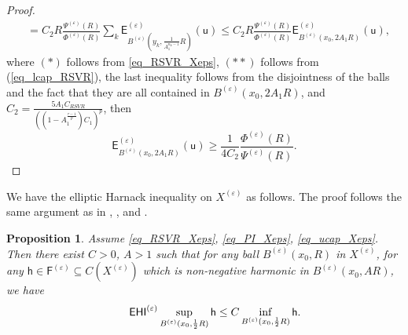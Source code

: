 \documentclass[11pt,a4paper]{article}
\numberwithin{equation}{section}
\theoremstyle{plain}
\newtheorem{proposition}[theorem]{Proposition}
\theoremstyle{definition}
\begin{document}
\begin{proof}
\begin{align*}
&=C_2R\frac{\Psi^{(\varepsilon)}(R)}{\Phi^{(\varepsilon)}(R)}\sum_k\mathsf{E}^{(\varepsilon)}_{B^{(\varepsilon)}(y_k,\frac{1}{A_1^{n_k-1}}R)}(\mathsf{u})\le C_2R\frac{\Psi^{(\varepsilon)}(R)}{\Phi^{(\varepsilon)}(R)}\mathsf{E}^{(\varepsilon)}_{B^{(\varepsilon)}(x_0,2A_1R)}(\mathsf{u}),
\end{align*}
where $(*)$ follows from \ref{eq_RSVR_Xeps}, $(**)$ follows from (\ref{eq_lcap_RSVR}), the last inequality follows from the disjointness of the balls and the fact that they are all contained in $B^{(\varepsilon)}(x_0,2A_1R)$, and $C_2=\frac{5A_1C_{RSVR}}{\left((1-A_1^{{\frac{\tau-1}{p}}})C_1\right)^p}$, then
$$\mathsf{E}^{(\varepsilon)}_{B^{(\varepsilon)}(x_0,2A_1R)}(\mathsf{u})\ge \frac{1}{4C_2}\frac{\Phi^{(\varepsilon)}(R)}{\Psi^{(\varepsilon)}(R)}.$$
\end{proof}

We have the elliptic Harnack inequality on $X^{(\varepsilon)}$ as follows. The proof follows the same argument as in \cite[THEOREM 4.3]{Hol03}, \cite[THEOREM 1.1]{Mur23a}, and \cite[Theorem 5.4]{MS25}.

\begin{proposition}\label{prop_EHI_Xeps}
Assume \ref{eq_RSVR_Xeps}, \ref{eq_PI_Xeps}, \ref{eq_ucap_Xeps}. Then there exist $C>0$, $A>1$ such that for any ball $B^{(\varepsilon)}(x_0,R)$ in $X^{(\varepsilon)}$, for any $\mathsf{h}\in\mathsf{F}^{(\varepsilon)}\subseteq C(X^{(\varepsilon)})$ which is non-negative harmonic in $B^{(\varepsilon)}(x_0,AR)$, we have
\begin{equation*}\label{eq_EHI_Xeps}\tag*{$\mathsf{EHI}^{(\varepsilon)}$}
\sup_{B^{(\varepsilon)}(x_0,\frac{1}{2}R)}\mathsf{h}\le C\inf_{B^{(\varepsilon)}(x_0,\frac{1}{2}R)}\mathsf{h}.
\end{equation*}
\end{proposition}
\end{document}

